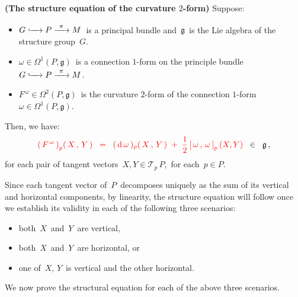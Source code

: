 \vskip 0.5cm
\begin{proposition}\label{StructureEquationOfCurvatureTwoForm}
\textnormal{\bf(The structure equation of the curvature $2$-form)}
\mbox{}
\vskip 0.1cm
\noindent
Suppose:
\begin{itemize}
\item
	\vskip -0.2cm
	$G \xhookrightarrow{{\color{white}222}} P \xrightarrow{{\color{white}2}\pi{\color{white}2}} M$\,
	is a principal bundle and
	\,$\mathfrak{g}$\, is the Lie algebra of the structure group \,$G$.\,
\item
	\vskip -0.1cm
	$\omega \in \Omega^{1}(P,\mathfrak{g})$\, is a connection $1$-form on the principle bundle
	$G \xhookrightarrow{{\color{white}222}} P \xrightarrow{{\color{white}2}\pi{\color{white}2}} M$.\,
\item
	$F^{\,\omega} \in \Omega^{2}(P,\mathfrak{g})$\, is the curvature $2$-form
	of the connection $1$-form $\omega \in \Omega^{1}(P,\mathfrak{g})$.\,
\end{itemize}
Then, we have:
\begin{equation*}
{\color{red}
\left(\,F^{\,\omega}\,\right)_{p}\!\left(\,X\,,\,Y\,\right)
\;\; = \;\;
	(\,\textnormal{d}\,\omega\,)_{p}\!\left(\,X\,,\,Y\,\right)
	\; + \;
	\dfrac{1}{2}\left[\,\omega\,,\,\omega\,\right]_{p}(X,Y)
}
\;\; \in \;\;
	\mathfrak{g}\,,
\end{equation*}
for each pair of tangent vectors \,$X, Y \in \mathcal{T}_{p}\,P$,\,
for each \,$p \in P$.
\end{proposition}
\proof
Since each tangent vector of \,$P$\, decomposes uniquely
as the sum of its vertical and horizontal components,
by linearity, the structure equation will follow once we establish
its validity in each of the following three scenarios:
\begin{itemize}
\item
	both \,$X$\, and \,$Y$\, are vertical,
\item
	both \,$X$\, and \,$Y$\, are horizontal, or
\item
	one of \,$X$, $Y$\, is vertical and the other horizontal.
\end{itemize}
We now prove the structural equation for each of the above three scenarios.

